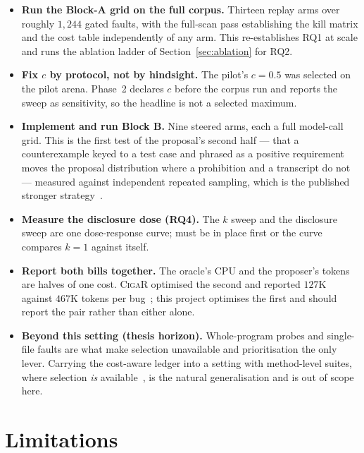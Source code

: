 \begin{itemize}[leftmargin=*,itemsep=4pt]
\item \textbf{Run the Block-A grid on the full corpus.} Thirteen replay arms
over roughly $1{,}244$ gated faults, with the  full-scan pass
establishing the kill matrix and the cost table independently of any arm.
This re-establishes RQ1 at scale and runs the ablation ladder of
Section~\ref{sec:ablation} for RQ2.
\item \textbf{Fix $c$ by protocol, not by hindsight.} The pilot's $c = 0.5$
was selected on the pilot arena. Phase~2 declares $c$ before the corpus run and
reports the sweep as sensitivity, so the headline is not a selected maximum.
\item \textbf{Implement and run Block B.} Nine steered arms, each a full
model-call grid. This is the first test of the proposal's second half --- that
a counterexample keyed to a test case and phrased as a positive requirement
moves the proposal distribution where a prohibition and a transcript do not ---
measured against independent repeated sampling, which is the published stronger
strategy~\citep{chen2025conversational}.
\item \textbf{Measure the disclosure dose (RQ4).} The $k$ sweep and the
disclosure sweep are one dose-response curve;  must be in
place first or the curve compares $k{=}1$ against itself.
\item \textbf{Report both bills together.} The oracle's CPU and the proposer's
tokens are halves of one cost. \textsc{CigaR} optimised the second and reported
$127$K against $467$K tokens per bug~\citep{hidvegi2024cigar}; this project
optimises the first and should report the pair rather than either alone.
\item \textbf{Beyond this setting (thesis horizon).} Whole-program probes and
single-file faults are what make selection unavailable and prioritisation the
only lever. Carrying the cost-aware ledger into a setting with method-level
suites, where selection \emph{is} available~\citep{lou2024aprregression}, is
the natural generalisation and is out of scope here.
\end{itemize}

\section{Limitations}

